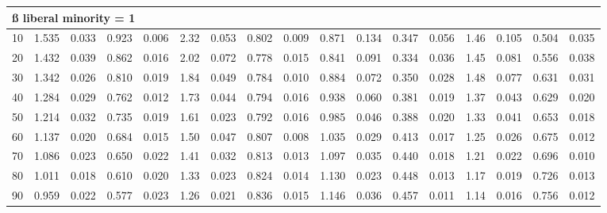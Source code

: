 \documentclass[
]{article}
\begin{document}
\begin{table}[H]
\begin{table}
{\begin{tabular}{r|r|r|r|r|r|r|r|r|r|r|r|r|r|r|r|r}
\hline
\multicolumn{17}{l}{\textbf{ß liberal minority = 1}}\\
\hline
\hspace{1em}10 & 1.535 & 0.033 & 0.923 & 0.006 & 2.32 & 0.053 & 0.802 & 0.009 & 0.871 & 0.134 & 0.347 & 0.056 & 1.46 & 0.105 & 0.504 & 0.035\\
\hline
\hspace{1em}20 & 1.432 & 0.039 & 0.862 & 0.016 & 2.02 & 0.072 & 0.778 & 0.015 & 0.841 & 0.091 & 0.334 & 0.036 & 1.45 & 0.081 & 0.556 & 0.038\\
\hline
\hspace{1em}30 & 1.342 & 0.026 & 0.810 & 0.019 & 1.84 & 0.049 & 0.784 & 0.010 & 0.884 & 0.072 & 0.350 & 0.028 & 1.48 & 0.077 & 0.631 & 0.031\\
\hline
\hspace{1em}40 & 1.284 & 0.029 & 0.762 & 0.012 & 1.73 & 0.044 & 0.794 & 0.016 & 0.938 & 0.060 & 0.381 & 0.019 & 1.37 & 0.043 & 0.629 & 0.020\\
\hline
\hspace{1em}50 & 1.214 & 0.032 & 0.735 & 0.019 & 1.61 & 0.023 & 0.792 & 0.016 & 0.985 & 0.046 & 0.388 & 0.020 & 1.33 & 0.041 & 0.653 & 0.018\\
\hline
\hspace{1em}60 & 1.137 & 0.020 & 0.684 & 0.015 & 1.50 & 0.047 & 0.807 & 0.008 & 1.035 & 0.029 & 0.413 & 0.017 & 1.25 & 0.026 & 0.675 & 0.012\\
\hline
\hspace{1em}70 & 1.086 & 0.023 & 0.650 & 0.022 & 1.41 & 0.032 & 0.813 & 0.013 & 1.097 & 0.035 & 0.440 & 0.018 & 1.21 & 0.022 & 0.696 & 0.010\\
\hline
\hspace{1em}80 & 1.011 & 0.018 & 0.610 & 0.020 & 1.33 & 0.023 & 0.824 & 0.014 & 1.130 & 0.023 & 0.448 & 0.013 & 1.17 & 0.019 & 0.726 & 0.013\\
\hline
\hspace{1em}90 & 0.959 & 0.022 & 0.577 & 0.023 & 1.26 & 0.021 & 0.836 & 0.015 & 1.146 & 0.036 & 0.457 & 0.011 & 1.14 & 0.016 & 0.756 & 0.012\\
\hline
\end{tabular}}
\end{table}
\end{table}
\end{document}
